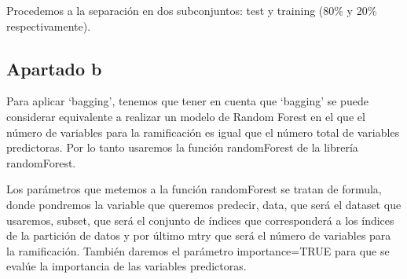 \documentclass[]{article}
\newenvironment{Shaded}{\begin{snugshade}}{\end{snugshade}}
\newcommand{\KeywordTok}[1]{\textcolor[rgb]{0.13,0.29,0.53}{\textbf{{#1}}}}
\newcommand{\DataTypeTok}[1]{\textcolor[rgb]{0.13,0.29,0.53}{{#1}}}
\newcommand{\DecValTok}[1]{\textcolor[rgb]{0.00,0.00,0.81}{{#1}}}
\newcommand{\FloatTok}[1]{\textcolor[rgb]{0.00,0.00,0.81}{{#1}}}
\newcommand{\StringTok}[1]{\textcolor[rgb]{0.31,0.60,0.02}{{#1}}}
\newcommand{\OtherTok}[1]{\textcolor[rgb]{0.56,0.35,0.01}{{#1}}}
\newcommand{\NormalTok}[1]{{#1}}
\begin{document}
Procedemos a la separación en dos subconjuntos: test y training (80\% y
20\% respectivamente).

\begin{Shaded}
\end{Shaded}

\subsection{Apartado b}\label{apartado-b-1}

Para aplicar `bagging', tenemos que tener en cuenta que `bagging' se
puede considerar equivalente a realizar un modelo de Random Forest en el
que el número de variables para la ramificación es igual que el número
total de variables predictoras. Por lo tanto usaremos la función
randomForest de la librería randomForest.

Los parámetros que metemos a la función randomForest se tratan de
formula, donde pondremos la variable que queremos predecir, data, que
será el dataset que usaremos, subset, que será el conjunto de índices
que corresponderá a los índices de la partición de datos y por último
mtry que será el número de variables para la ramificación. También
daremos el parámetro importance=TRUE para que se evalúe la importancia
de las variables predictoras.

\begin{Shaded}
\end{Shaded}
\end{document}
